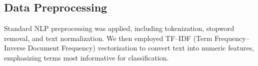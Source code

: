 \subsection{Data Preprocessing}  %
Standard NLP preprocessing was applied, including tokenization, stop\textendash word
removal, and text normalization. We then employed TF–IDF
(Term Frequency–Inverse Document Frequency) vectorization to convert text into
numeric features, emphasizing terms most informative for classification.